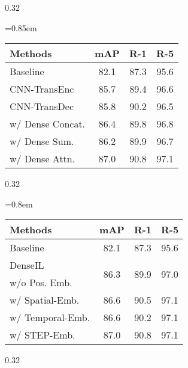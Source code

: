 \documentclass[10pt,twocolumn,letterpaper]{article}
\begin{document}
\begin{table*}[t]
    \begin{subtable}[t]{0.32\textwidth}
		\footnotesize
		\caption{We compare Dense Attention with its counterparts.}
		\label{tab:ablationarch}
		{\def\arraystretch{1}\tabcolsep=0.85em
		\begin{tabular}[t]{@{}l|ccc@{}}
			\toprule[1.5pt]
			Methods & mAP & R-1 & R-5  \\
			\midrule
			Baseline                     & 82.1    & 87.3    & 95.6     \\
			\midrule
			CNN-TransEnc               & 85.7    &  89.4   &  96.6      \\
			CNN-TransDec           & 85.8    & 90.2    & 96.5      \\
			\midrule
			w/  Dense Concat.             & 86.4    & 89.8    & 96.8     \\
			w/  Dense Sum.             & 86.2    & 89.9    & 96.7   \\
			w/  Dense Attn.               & 87.0    & 90.8    & 97.1     \\
			\bottomrule[1.5pt]
		\end{tabular}
		}
	\end{subtable}\hspace{6pt}
	\begin{subtable}[t]{0.32\textwidth}
		\footnotesize
		\caption{DenseIL with / without positional embedding.}
		\label{tab:ablationemb}
		{\def\arraystretch{1}\tabcolsep=0.8em
		\begin{tabular}[t]{@{}l|ccc@{}}
			\toprule[1.5pt]
			Methods  & mAP & R-1 & R-5  \\
			\midrule
			Baseline                     & 82.1    & 87.3    & 95.6     \\
			\midrule
			DenseIL  & \multirow{2}{*}{86.3} & \multirow{2}{*}{89.9} & \multirow{2}{*}{97.0} \\
			w/o Pos. Emb. &  &  &   \\
			\midrule
			w/ Spatial-Emb.           & 86.6    & 90.5    & 97.1    \\
			w/ Temporal-Emb.             & 86.6    & 90.2    & 97.1    \\
			w/ STEP-Emb.               & 87.0    & 90.8    & 97.1    \\
			\bottomrule[1.5pt]
		\end{tabular}
		}
	\end{subtable}\hspace{6pt}
	\begin{subtable}[t]{0.32\textwidth}

\end{subtable}
\end{table*}
\end{document}

